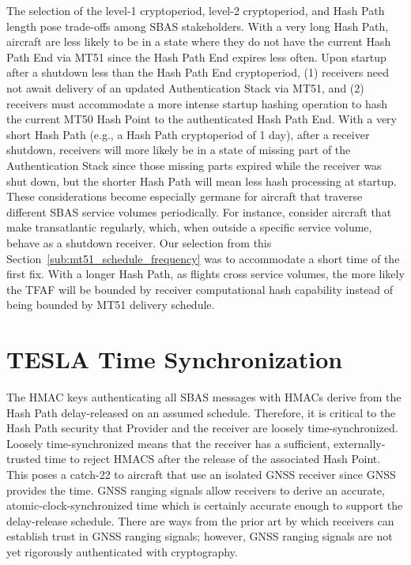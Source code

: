 \documentclass[letterpaper,times]{IONconf/IONconf}
\begin{document}
		The selection of the level-1 cryptoperiod, level-2 cryptoperiod, and Hash Path length pose trade-offs among SBAS stakeholders.
		With a very long Hash Path, aircraft are less likely to be in a state where they do not have the current Hash Path End via MT51 since the Hash Path End expires less often.
		Upon startup after a shutdown less than the Hash Path End cryptoperiod, (1) receivers need not await delivery of an updated Authentication Stack via MT51, and (2) receivers must accommodate a more intense startup hashing operation to hash the current MT50 Hash Point to the authenticated Hash Path End.
		With a very short Hash Path (e.g., a Hash Path cryptoperiod of 1 day), after a receiver shutdown, receivers will more likely be in a state of missing part of the Authentication Stack since those missing parts expired while the receiver was shut down, but the shorter Hash Path will mean less hash processing at startup.
		These considerations become especially germane for aircraft that traverse different SBAS service volumes periodically.
		For instance, consider aircraft that make transatlantic regularly, which, when outside a specific service volume, behave as a shutdown receiver.
		Our selection from this Section~\ref{sub:mt51_schedule_frequency} was to accommodate a short time of the first fix.
		With a longer Hash Path, as flights cross service volumes, the more likely the TFAF will be bounded by receiver computational hash capability instead of being bounded by MT51 delivery schedule.

\section{TESLA Time Synchronization} \label{sec:tesla_time_synchronization}

	The HMAC keys authenticating all SBAS messages with HMACs derive from the Hash Path delay-released on an assumed schedule.
	Therefore, it is critical to the Hash Path security that Provider and the receiver are loosely time-synchronized.
	Loosely time-synchronized means that the receiver has a sufficient, externally-trusted time to reject HMACS after the release of the associated Hash Point.
	This poses a catch-22 to aircraft that use an isolated GNSS receiver since GNSS provides the time.
	GNSS ranging signals allow receivers to derive an accurate, atomic-clock-synchronized time which is certainly accurate enough to support the delay-release schedule.
	There are ways from the prior art by which receivers can establish trust in GNSS ranging signals\cite{Psiaki2016, Fernandez-Hernandez2018}; however, GNSS ranging signals are not yet rigorously authenticated with cryptography.
\end{document}
